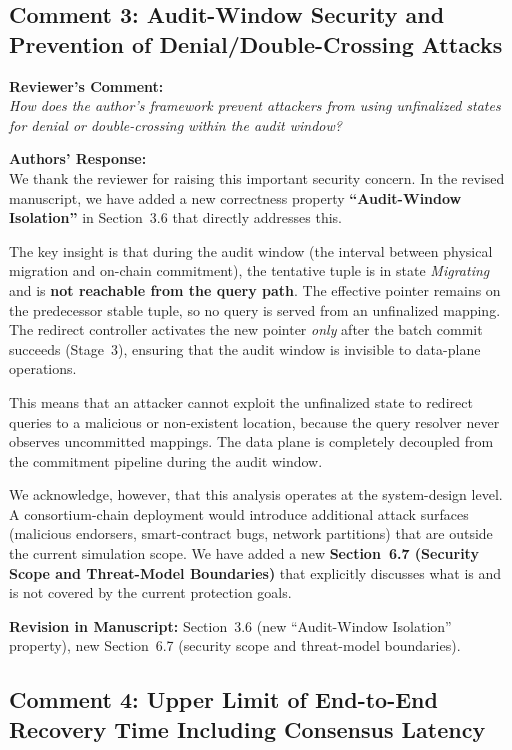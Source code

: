 \documentclass[11pt,a4paper]{article}
\newcommand{\reviewercomment}[1]{%
  \vspace{6pt}\noindent\textbf{\textcolor{reviewercolor}{Reviewer's Comment:}}\\
  \textcolor{reviewercolor}{\itshape #1}\vspace{4pt}}
\newcommand{\response}[1]{%
  \noindent\textbf{\textcolor{responsecolor}{Authors' Response:}}\\
  #1\vspace{8pt}}
\newcommand{\revision}[1]{%
  \noindent\textbf{Revision in Manuscript:} #1\vspace{4pt}}
\begin{document}
\subsection*{Comment 3: Audit-Window Security and Prevention of Denial/Double-Crossing Attacks}

\reviewercomment{How does the author's framework prevent attackers from using unfinalized states for denial or double-crossing within the audit window?}

\response{We thank the reviewer for raising this important security concern. In the revised manuscript, we have added a new correctness property \textbf{``Audit-Window Isolation''} in Section~3.6 that directly addresses this.

The key insight is that during the audit window (the interval between physical migration and on-chain commitment), the tentative tuple is in state \emph{Migrating} and is \textbf{not reachable from the query path}. The effective pointer remains on the predecessor stable tuple, so no query is served from an unfinalized mapping. The redirect controller activates the new pointer \emph{only} after the batch commit succeeds (Stage~3), ensuring that the audit window is invisible to data-plane operations.

This means that an attacker cannot exploit the unfinalized state to redirect queries to a malicious or non-existent location, because the query resolver never observes uncommitted mappings. The data plane is completely decoupled from the commitment pipeline during the audit window.

We acknowledge, however, that this analysis operates at the system-design level. A consortium-chain deployment would introduce additional attack surfaces (malicious endorsers, smart-contract bugs, network partitions) that are outside the current simulation scope. We have added a new \textbf{Section~6.7 (Security Scope and Threat-Model Boundaries)} that explicitly discusses what is and is not covered by the current protection goals.}

\revision{Section~3.6 (new ``Audit-Window Isolation'' property), new Section~6.7 (security scope and threat-model boundaries).}

\subsection*{Comment 4: Upper Limit of End-to-End Recovery Time Including Consensus Latency}
\end{document}
